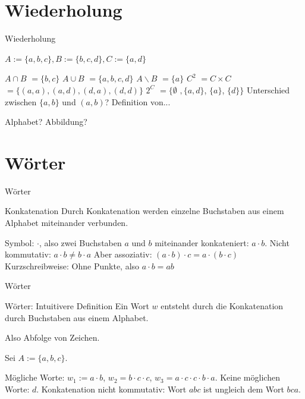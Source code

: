 \def\tutdate{4.11.2016}


\section{Wiederholung}
\begin{frame}{Wiederholung}
	\pause
	
	$A := \{a, b, c\}, B := \{b, c, d\}, C := \{a, d\}$
	
	\begin{itemize}
		\pitem $A \cap B$ \pause $= \{b, c\}$
		\pitem $A \cup B$ \pause $= \{a, b, c, d\}$
		\pitem $A \backslash B$ \pause $= \{a\}$
		\pitem $C^2$ \pause $ = C \times C$ \pause $= \{(a, a), (a, d), (d, a), (d, d)\}$
		\pitem $2^C$ \pause $ = \{\emptyset$ \pause $, \{a, d\}$, \pause $\{a\}$, \pause $\{d\}\}$
		\pitem Unterschied zwischen $\{a, b\}$ und $(a, b)$?
		\pitem Definition von...
		\begin{itemize}
			\pitem Alphabet?
			\pitem Abbildung?
		\end{itemize}
	\end{itemize}
\end{frame}

\section{Wörter}

\begin{frame}{Wörter}
	\pause
	\begin{block}{Konkatenation}
		Durch Konkatenation werden einzelne Buchstaben aus einem Alphabet miteinander verbunden.
	\end{block}

	\begin{itemize}
		\pitem Symbol: $\cdot$\pause , also zwei Buchstaben $a$ und $b$ miteinander konkateniert: $a \cdot b$.
		\pitem Nicht kommutativ\pause : $a \cdot b \neq b \cdot a$
		\pitem Aber assoziativ\pause : $(a \cdot b) \cdot c = a \cdot (b \cdot c)$
		\pitem Kurzschreibweise\pause : Ohne Punkte\pause , also $a \cdot b = ab$
	\end{itemize}
\end{frame}

\begin{frame}{Wörter}
	\pause
	\begin{block}{Wörter: Intuitivere Definition}
		Ein Wort $w$ \pause entsteht durch die Konkatenation durch Buchstaben aus einem Alphabet.
	\end{block}

	\pause Also Abfolge von Zeichen.

	\pause Sei $A := \{a, b, c\}$.

	\begin{itemize}
		\pitem Mögliche Worte: \pause $w_1 := a \cdot b$\pause , $w_2 = b \cdot c \cdot c$\pause , $w_3 = a \cdot c \cdot c \cdot b \cdot a$.
		\pitem Keine möglichen Worte: \pause $d$.
		\pitem Konkatenation nicht kommutativ\pause : Wort $abc$ \pause ist ungleich dem Wort $bca$.
	\end{itemize}
\end{frame}

